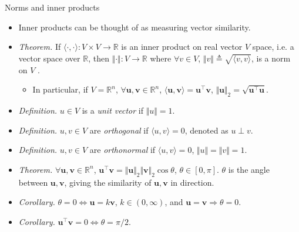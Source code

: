 \documentclass{beamer}
\numberwithin{equation}{section}
\begin{document}
\begin{frame}{Norms and inner products}
    \begin{itemize}
        \item
        Inner products can be thought of as measuring vector similarity.

        \item
        \textit{Theorem.} If $ \langle\cdot, \cdot\rangle : V \times V
        \rightarrow \mathbb{R} $ is an inner product on real vector $ V $
        space, i.e. a vector space over $ \mathbb{R} $, then
        $ \Vert\cdot\Vert : V \rightarrow \mathbb{R} $ where
        $ \forall v \in V $, $ \Vert v\Vert \triangleq
        \sqrt{\langle v, v\rangle} $, is a norm on $ V $ \cite{jacob_linalg}.
        \begin{itemize}
            \item
            In particular, if $ V = \mathbb{R}^n $, $ \forall \mathbf{u},
            \mathbf{v} \in \mathbb{R}^n $, $ \langle\mathbf{u},
            \mathbf{v}\rangle  = \mathbf{u}^\top\mathbf{v} $,
            $ \Vert\mathbf{u}\Vert_2 = \sqrt{\mathbf{u}^\top\mathbf{u}} $.
        \end{itemize}

        \item
        \textit{Definition.} $ u \in V $ is a \textit{unit vector} if
        $ \Vert u\Vert = 1 $.        

        \item
	    \textit{Definition.} $ u, v \in V $ are \textit{orthogonal} if 
	    $ \langle u, v\rangle = 0 $, denoted as $ u \perp v $.

        \item
        \textit{Definition.} $ u, v \in V $ are \textit{orthonormal} if
        $ \langle u, v\rangle = 0 $, $ \Vert u\Vert = \Vert v\Vert = 1 $.

        \item
        \textit{Theorem.} $ \forall \mathbf{u}, \mathbf{v} \in \mathbb{R}^n $,
        $ \mathbf{u}^\top\mathbf{v} = \Vert\mathbf{u}\Vert_2
        \Vert\mathbf{v}\Vert_2\cos\theta $, $ \theta \in [0, \pi] $.
        $ \theta $ is the angle between $ \mathbf{u}, \mathbf{v} $, giving the
        similarity of $ \mathbf{u}, \mathbf{v} $ in direction.

        \item
        \textit{Corollary.} $ \theta = 0 \Leftrightarrow
        \mathbf{u} = k\mathbf{v} $, $ k \in (0, \infty) $, and $ \mathbf{u} =
        \mathbf{v} \Rightarrow \theta = 0 $.

        \item
        \textit{Corollary.} $ \mathbf{u}^\top\mathbf{v} = 0 \Leftrightarrow
        \theta = \pi / 2 $.
    \end{itemize}
\end{frame}
\end{document}
